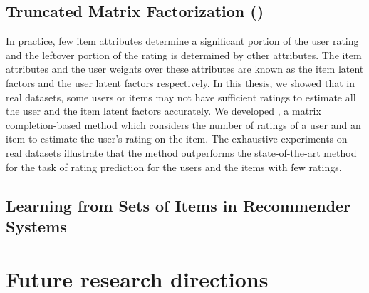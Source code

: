 \subsection*{Truncated Matrix Factorization (\TMF)}
In practice, few item attributes determine a significant portion of the user rating and the leftover portion of the rating is determined by other attributes. The item attributes and the user weights over these attributes are known as the item latent factors and the user latent factors respectively. In this thesis, we showed that in real datasets,  some users or items may not have sufficient ratings to estimate all the user and the item latent factors accurately.
We developed \TMF, a matrix completion-based method which considers the number of ratings of a user and an item to estimate the user's rating on the item. The exhaustive experiments on real datasets illustrate that the \TMF method outperforms the state-of-the-art \MF method for the task of rating prediction for the users and the items with few ratings.




\subsection*{\CFEXPB}






\subsection*{Learning from Sets of Items in Recommender Systems}







\section{Future research directions}






